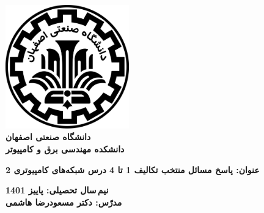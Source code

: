 \begin{titlepage}
\begin{center}
\includegraphics[width=0.4\textwidth]{figures/IUT Logo.png}\\
        
\LARGE
\textbf{دانشگاه صنعتی اصفهان}\\
\textbf{دانشکده مهندسی برق و کامپیوتر}\\
        
\vfill
        
\huge
\textbf{عنوان: پاسخ مسائل منتخب تکالیف 1 تا 4 درس شبکه‌های کامپیوتری 2}\\
        
\vfill
        
\LARGE
\textbf{نیم\,سال تحصیلی: پاییز 1401}\\
\textbf{مدرّس: دکتر مسعودرضا هاشمی}\\
\end{center}
\end{titlepage}
